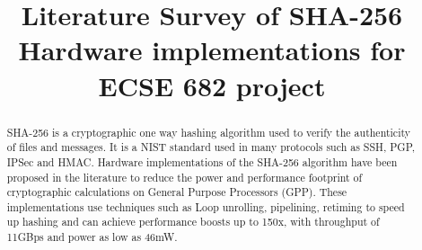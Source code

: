 \documentclass[conference]{IEEEtran}
\begin{document}
%
\title{Literature Survey of SHA-256 Hardware implementations for ECSE 682 project}


\author{
}

\maketitle

\begin{abstract}
SHA-256 is a cryptographic one way hashing algorithm used to verify the authenticity of files and messages. It is a NIST standard used in many protocols such as SSH, PGP, IPSec and HMAC. Hardware implementations of the SHA-256 algorithm have been proposed in the literature to reduce the power and performance footprint of cryptographic calculations on General Purpose Processors (GPP). These implementations use techniques such as Loop unrolling, pipelining, retiming to speed up hashing and can achieve performance boosts up to 150x, with throughput of 11GBps and power as low as 46mW.
\end{abstract}

\IEEEpeerreviewmaketitle
\end{document}
